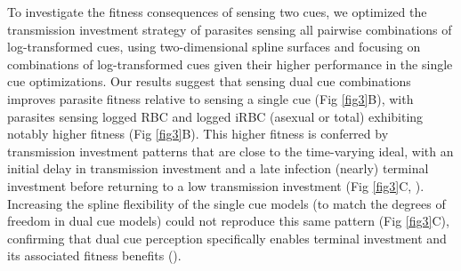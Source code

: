 \documentclass[10pt,letterpaper]{article}
\begin{document}
To investigate the fitness consequences of sensing two cues, we optimized the transmission investment strategy of parasites sensing all pairwise combinations of log-transformed cues, using two-dimensional spline surfaces and focusing on combinations of log-transformed cues given their higher performance in the single cue optimizations. Our results suggest that sensing dual cue combinations improves parasite fitness relative to sensing a single cue (Fig \ref{fig3}B), with parasites sensing logged RBC and logged iRBC (asexual or total) exhibiting notably higher fitness (Fig \ref{fig3}B). This higher fitness is conferred by transmission investment patterns that are close to the time-varying ideal, with an initial delay in transmission investment and a late infection (nearly) terminal investment before returning to a low transmission investment (Fig \ref{fig3}C, ). Increasing the spline flexibility of the single cue models (to match the degrees of freedom in dual cue models) could not reproduce this same pattern (Fig \ref{fig3}C), confirming that dual cue perception specifically enables terminal investment and its associated fitness benefits ().\newline
\end{document}
